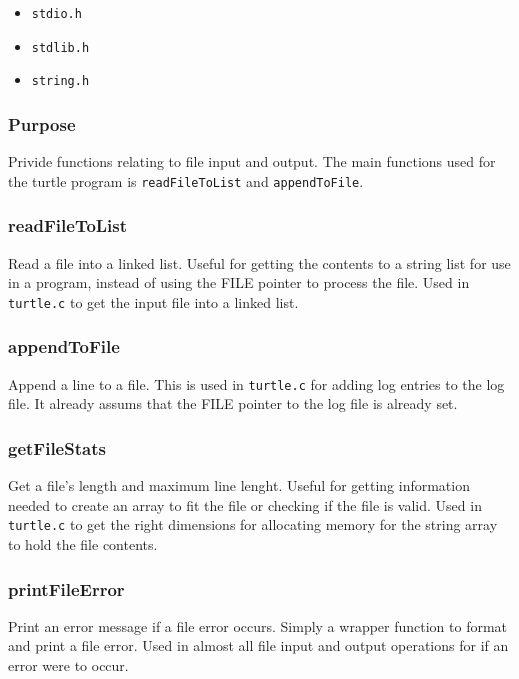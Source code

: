 \documentclass[a4paper, 12pt, titlepage]{article}
\newcommand{\code}[1]{\small\texttt{#1}\normalsize}
\begin{document}
\begin{itemize}[label={--}, noitemsep]
    \item \code{stdio.h}
    \item \code{stdlib.h}
    \item \code{string.h}
\end{itemize}

\subsubsection{Purpose}

Privide functions relating to file input and output. The main functions used
for the turtle program is \code{readFileToList} and \code{appendToFile}.

\subsubsection{readFileToList}

Read a file into a linked list. Useful for getting the contents to a string
list for use in a program, instead of using the FILE pointer to process
the file. Used in \code{turtle.c} to get the input file into a linked list.

\subsubsection{appendToFile}

Append a line to a file. This is used in \code{turtle.c} for adding log
entries to the log file. It already assums that the FILE pointer to the
log file is already set.

\subsubsection{getFileStats}

Get a file's length and maximum line lenght. Useful for getting information
needed to create an array to fit the file or checking if the file is valid.
Used in \code{turtle.c} to get the right dimensions for allocating memory
for the string array to hold the file contents.

\subsubsection{printFileError}

Print an error message if a file error occurs. Simply a wrapper function to
format and print a file error. Used in almost all file input and output
operations for if an error were to occur.
\end{document}

